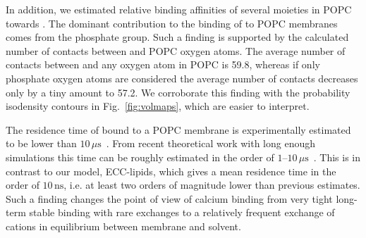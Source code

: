\documentclass[aip,jcp,twocolumn]{revtex4}
\begin{document}
In addition, we estimated relative binding affinities 
of several moieties in POPC towards . 
The dominant contribution
to the binding of  to POPC membranes comes from the phosphate group. 
Such a finding is supported by the calculated
number of contacts between  and POPC oxygen atoms.
The average number of contacts between  and any oxygen atom in POPC is 59.8, 
whereas if only phosphate oxygen atoms are considered 
the average number of contacts decreases only by a tiny amount to 57.2. 
We corroborate this finding with the probability isodensity contours in Fig.~\ref{fig:volmaps}, 
which are easier to interpret.

The residence time of  bound to a POPC membrane 
is experimentally estimated to be lower than $10\,\mu\mathrm{s}$~\cite{altenbach84}. 
From recent theoretical work with long enough simulations this time can be roughly estimated
in the order of $1$--$10\,\mu\mathrm{s}$~\cite{javanainen17}. 
This is in contrast to our model, ECC-lipids, 
which gives a mean residence time in the order of $10\,\mathrm{ns}$, 
i.e. at least two orders of magnitude lower than previous estimates.
Such a finding changes the point of view of calcium binding from
very tight long-term stable binding with rare exchanges to 
a relatively frequent exchange of cations 
in equilibrium between membrane and solvent. 






\end{document}
